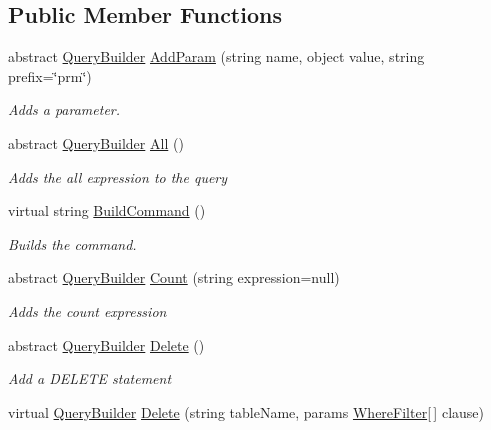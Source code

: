 \subsection*{Public Member Functions}
\begin{DoxyCompactItemize}
\item 
abstract \hyperlink{classOTA_1_1Data_1_1QueryBuilder}{Query\+Builder} \hyperlink{classOTA_1_1Data_1_1QueryBuilder_a07212319b039305abae33173ed4a7c51}{Add\+Param} (string name, object value, string prefix=\char`\"{}prm\char`\"{})
\begin{DoxyCompactList}\small\item\em Adds a parameter. \end{DoxyCompactList}\item 
abstract \hyperlink{classOTA_1_1Data_1_1QueryBuilder}{Query\+Builder} \hyperlink{classOTA_1_1Data_1_1QueryBuilder_a8bf63a966801d4616b4b60d8f915a623}{All} ()
\begin{DoxyCompactList}\small\item\em Adds the all expression to the query \end{DoxyCompactList}\item 
virtual string \hyperlink{classOTA_1_1Data_1_1QueryBuilder_a8adc78127122feef77727bf7fa43c520}{Build\+Command} ()
\begin{DoxyCompactList}\small\item\em Builds the command. \end{DoxyCompactList}\item 
abstract \hyperlink{classOTA_1_1Data_1_1QueryBuilder}{Query\+Builder} \hyperlink{classOTA_1_1Data_1_1QueryBuilder_aeda27740a724da1694b6d6a3e471ff01}{Count} (string expression=null)
\begin{DoxyCompactList}\small\item\em Adds the count expression \end{DoxyCompactList}\item 
abstract \hyperlink{classOTA_1_1Data_1_1QueryBuilder}{Query\+Builder} \hyperlink{classOTA_1_1Data_1_1QueryBuilder_a8670bcdb50bf5efb7f438bd6bf761386}{Delete} ()
\begin{DoxyCompactList}\small\item\em Add a D\+E\+L\+E\+T\+E statement \end{DoxyCompactList}\item 
virtual \hyperlink{classOTA_1_1Data_1_1QueryBuilder}{Query\+Builder} \hyperlink{classOTA_1_1Data_1_1QueryBuilder_a7a8556bc201e800c203b7bd14598882a}{Delete} (string table\+Name, params \hyperlink{structOTA_1_1Data_1_1WhereFilter}{Where\+Filter}\mbox{[}$\,$\mbox{]} clause)

\end{DoxyCompactItemize}
